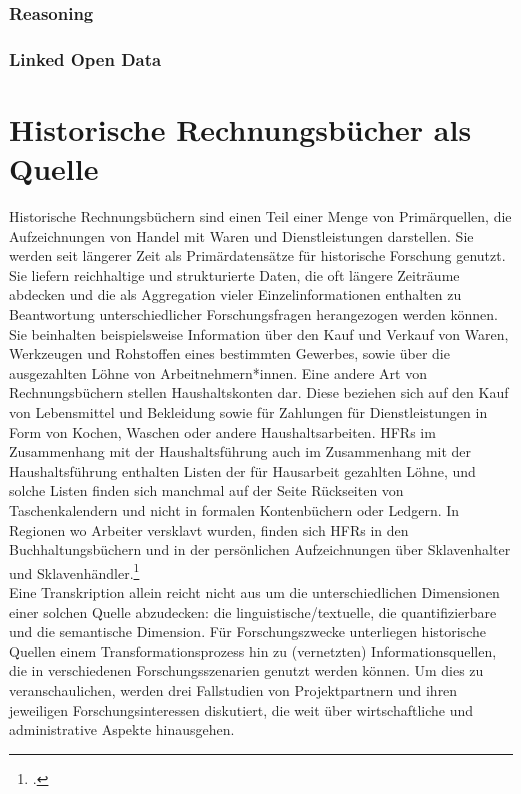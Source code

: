 \documentclass[12pt,a4paper]{article}
\begin{document}
\subsubsection{Reasoning}

\subsubsection{Linked Open Data}

\section{Historische Rechnungsbücher als Quelle}

Historische Rechnungsbüchern sind einen Teil einer Menge von Primärquellen, die Aufzeichnungen von Handel mit Waren und Dienstleistungen darstellen. Sie werden seit längerer Zeit als Primärdatensätze für historische Forschung genutzt. Sie liefern reichhaltige und strukturierte Daten, die oft längere Zeiträume abdecken und die als Aggregation vieler Einzelinformationen enthalten zu Beantwortung unterschiedlicher Forschungsfragen herangezogen werden können. Sie beinhalten beispielsweise Information über den Kauf und Verkauf von Waren, Werkzeugen und Rohstoffen eines bestimmten Gewerbes, sowie über die ausgezahlten Löhne von Arbeitnehmern*innen. Eine andere Art von Rechnungsbüchern stellen Haushaltskonten dar. Diese beziehen sich auf den Kauf von Lebensmittel und Bekleidung sowie für Zahlungen für Dienstleistungen in Form von Kochen, Waschen oder andere Haushaltsarbeiten.   HFRs im Zusammenhang mit der Haushaltsführung auch im Zusammenhang mit der Haushaltsführung enthalten Listen der für Hausarbeit gezahlten Löhne, und solche Listen finden sich manchmal auf der Seite Rückseiten von Taschenkalendern und nicht in formalen Kontenbüchern oder Ledgern. In Regionen wo Arbeiter versklavt wurden, finden sich HFRs in den Buchhaltungsbüchern und in der persönlichen Aufzeichnungen über Sklavenhalter und Sklavenhändler.\footcite[][S.2]{tomasek2013encoding}
\\
Eine Transkription allein reicht nicht aus um die unterschiedlichen Dimensionen einer solchen Quelle abzudecken: die linguistische/textuelle, die quantifizierbare und die semantische Dimension. Für Forschungszwecke unterliegen historische Quellen einem Transformationsprozess hin zu (vernetzten) Informationsquellen, die in verschiedenen Forschungsszenarien genutzt werden können. Um dies zu veranschaulichen, werden drei Fallstudien von Projektpartnern und ihren jeweiligen Forschungsinteressen diskutiert, die weit über wirtschaftliche und administrative Aspekte hinausgehen.
\end{document}
